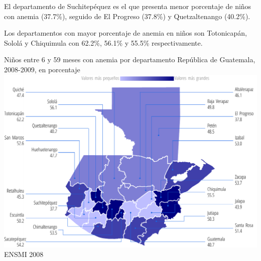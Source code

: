 
%
{%
	El departamento de Suchitepéquez es el que presenta menor porcentaje de niños con anemia (37.7\%), seguido de El Progreso (37.8\%) y Quetzaltenango (40.2\%).
	
	Los departamentos con mayor porcentaje de anemia en niños son Totonicapán, Sololá y Chiquimula con 62.2\%, 56.1\% y 55.5\% respectivamente.  
	
	  
}%
{%
	Niños entre 6 y 59 meses con anemia por departamento} %
{%
	República de Guatemala, 2008-2009, en porcentaje} %
{%
	\includegraphics[width=52\cuadri]{graficas/6_09.pdf}}%
{%
	ENSMI 2008} %